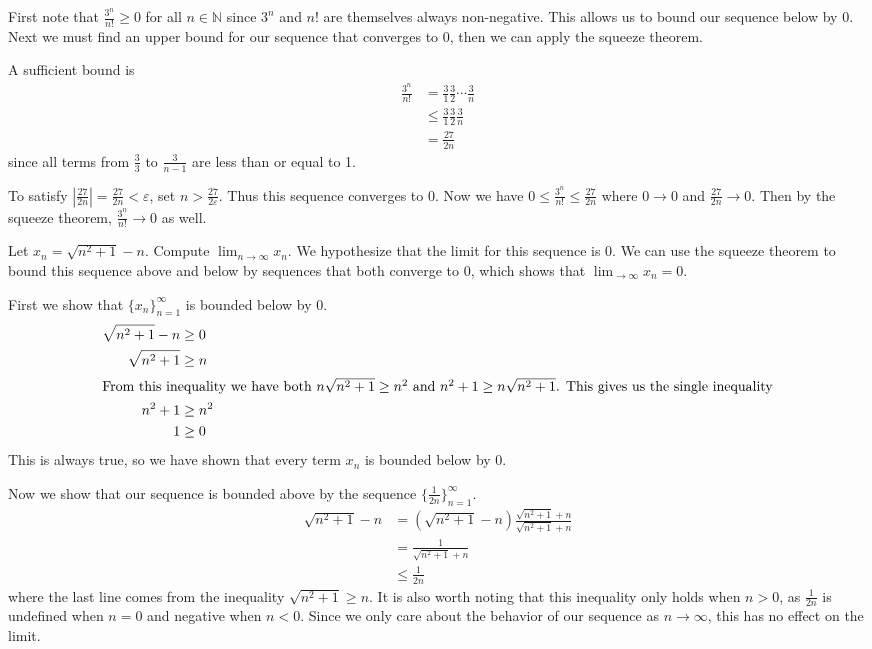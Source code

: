 \documentclass[10pt]{amsart}
\theoremstyle{plain}
\newenvironment{exercise}[1]{%
  \renewcommand\themanualtheoreminner{#1}%
  \manualtheoreminner
}{\endmanualtheoreminner}
\theoremstyle{definition}
\newcommand{\<}{\langle}
\renewcommand{\>}{\rangle}
\begin{document}
First note that $\frac{3^n}{n!} \geq 0$ for all $n \in \mathbb{N}$ since $3^n$ and $n!$ are themselves always non-negative. This allows us to bound our sequence below by 0. Next we must find an upper bound for our sequence that converges to 0, then we can apply the squeeze theorem.

A sufficient bound is
\begin{align*}
	\frac{3^n}{n!} &= \frac{3}{1} \frac{3}{2} \cdots \frac{3}{n} \\
		       &\leq \frac{3}{1} \frac{3}{2} \frac{3}{n} \\
		       &= \frac{27}{2n}
\end{align*}
since all terms from $\frac{3}{3}$ to $\frac{3}{n-1}$ are less than or equal to 1.

To satisfy $|\frac{27}{2n}| = \frac{27}{2n} < \varepsilon$, set $n > \frac{27}{2 \varepsilon}$. Thus this sequence converges to 0. Now we have $0 \leq \frac{3^n}{n!} \leq \frac{27}{2n}$ where $0 \to 0$ and $\frac{27}{2n} \to 0$. Then by the squeeze theorem, $\frac{3^n}{n!} \to 0$ as well.

\begin{exercise}{1.2.3}
	Let $x_n = \sqrt{n^2+1} - n$. Compute $\lim_{n \to \infty}x_n$.
\end{exercise}
We hypothesize that the limit for this sequence is 0. We can use the squeeze theorem to bound this sequence above and below by sequences that both converge to 0, which shows that $\lim_{ \to \infty}x_n = 0$.

First we show that $\{x_n\}_{n=1}^\infty$ is bounded below by 0.
\begin{align*}
	\sqrt{n^2+1} - n &\geq 0 \\
	\sqrt{n^2+1} &\geq n \\
	\intertext{From this inequality we have both $n \sqrt{n^2+1} \geq n^2$ and $n^2 + 1 \geq n \sqrt{n^2+1}$. This gives us the single inequality}
	n^2 + 1 &\geq n^2 \\
	1 &\geq 0
\end{align*}
This is always true, so we have shown that every term $x_n$ is bounded below by 0.

Now we show that our sequence is bounded above by the sequence $\{ \frac{1}{2n}\}_{n=1}^\infty$.
\begin{align*}
	\sqrt{n^2+1} - n &= (\sqrt{n^2+1} -n) \frac{\sqrt{n^2+1} + n}{\sqrt{n^2+1} + n} \\
			 &= \frac{1}{\sqrt{n^2+1} + n} \\
			 &\leq \frac{1}{2n}
\end{align*}
where the last line comes from the inequality $\sqrt{n^2+1} \geq n$. It is also worth noting that this inequality only holds when $n > 0$, as $\frac{1}{2n} $ is undefined when $n=0$ and negative when $n<0$. Since we only care about the behavior of our sequence as $n\to \infty$, this has no effect on the limit.
\end{document}
